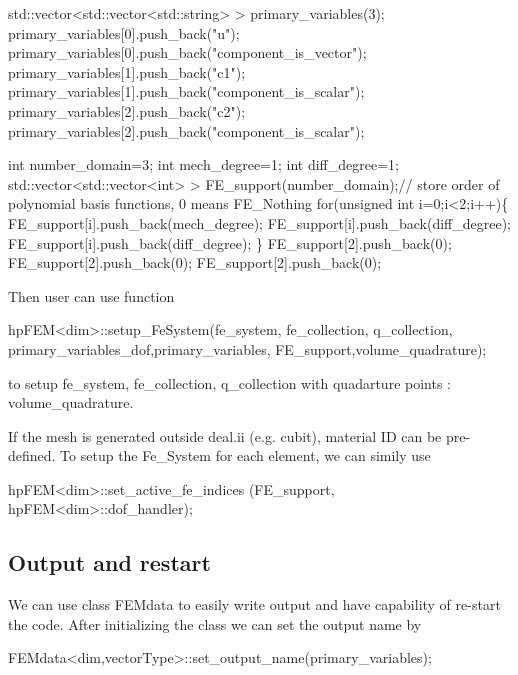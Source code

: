 \begin{DoxyCode}
std::vector<std::vector<std::string> > primary\_variables(3);        
primary\_variables[0].push\_back(\textcolor{stringliteral}{"u"}); primary\_variables[0].push\_back(\textcolor{stringliteral}{"component\_is\_vector"});
primary\_variables[1].push\_back(\textcolor{stringliteral}{"c1"}); primary\_variables[1].push\_back(\textcolor{stringliteral}{"component\_is\_scalar"});
primary\_variables[2].push\_back(\textcolor{stringliteral}{"c2"}); primary\_variables[2].push\_back(\textcolor{stringliteral}{"component\_is\_scalar"});

\textcolor{keywordtype}{int} number\_domain=3;
\textcolor{keywordtype}{int} mech\_degree=1;
\textcolor{keywordtype}{int} diff\_degree=1;
std::vector<std::vector<int> > FE\_support(number\_domain);\textcolor{comment}{// store order of polynomial basis functions, 0
       means FE\_Nothing   }
\textcolor{keywordflow}{for}(\textcolor{keywordtype}{unsigned} \textcolor{keywordtype}{int} i=0;i<2;i++)\{
    FE\_support[i].push\_back(mech\_degree);
    FE\_support[i].push\_back(diff\_degree);
    FE\_support[i].push\_back(diff\_degree);
\}
FE\_support[2].push\_back(0);
FE\_support[2].push\_back(0);
FE\_support[2].push\_back(0);
\end{DoxyCode}
 Then user can use function 
\begin{DoxyCode}
hpFEM<dim>::setup_FeSystem(fe\_system, fe\_collection, q\_collection, primary\_variables\_dof,primary\_variables,
      FE\_support,volume\_quadrature);
\end{DoxyCode}
 to setup {\ttfamily fe\-\_\-system}, {\ttfamily fe\-\_\-collection}, {\ttfamily q\-\_\-collection} with quadarture points \-: {\ttfamily volume\-\_\-quadrature}.\par
 If the mesh is generated outside deal.\-ii (e.\-g. cubit), material I\-D can be pre-\/defined. To setup the {\ttfamily Fe\-\_\-\-System} for each element, we can simily use 
\begin{DoxyCode}
hpFEM<dim>::set_active_fe_indices (FE\_support, hpFEM<dim>::dof_handler);
\end{DoxyCode}
 \hypertarget{brain_morph_outPut}{}\subsection{Output and restart}\label{brain_morph_outPut}
We can use class {\ttfamily F\-E\-Mdata} to easily write output and have capability of re-\/start the code. After initializing the class we can set the output name by 
\begin{DoxyCode}
FEMdata<dim,vectorType>::set_output_name(primary\_variables);
\end{DoxyCode}
